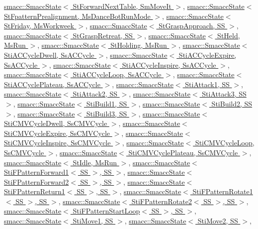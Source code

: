 \hyperlink{classsmacc_1_1SmaccState}{smacc\+::\+Smacc\+State$<$ St\+Forward\+Next\+Table, Sm\+Move\+It $>$}, \hyperlink{classsmacc_1_1SmaccState}{smacc\+::\+Smacc\+State$<$ St\+Fpattern\+Prealignment, Ms\+Dance\+Bot\+Run\+Mode $>$}, \hyperlink{classsmacc_1_1SmaccState}{smacc\+::\+Smacc\+State$<$ St\+Friday, Ms\+Workweek $>$}, \hyperlink{classsmacc_1_1SmaccState}{smacc\+::\+Smacc\+State$<$ St\+Grasp\+Approach, S\+S $>$}, \hyperlink{classsmacc_1_1SmaccState}{smacc\+::\+Smacc\+State$<$ St\+Grasp\+Retreat, S\+S $>$}, \hyperlink{classsmacc_1_1SmaccState}{smacc\+::\+Smacc\+State$<$ St\+Held, Ms\+Run $>$}, \hyperlink{classsmacc_1_1SmaccState}{smacc\+::\+Smacc\+State$<$ St\+Holding, Ms\+Run $>$}, \hyperlink{classsmacc_1_1SmaccState}{smacc\+::\+Smacc\+State$<$ Sti\+A\+C\+Cycle\+Dwell, Ss\+A\+C\+Cycle $>$}, \hyperlink{classsmacc_1_1SmaccState}{smacc\+::\+Smacc\+State$<$ Sti\+A\+C\+Cycle\+Expire, Ss\+A\+C\+Cycle $>$}, \hyperlink{classsmacc_1_1SmaccState}{smacc\+::\+Smacc\+State$<$ Sti\+A\+C\+Cycle\+Inspire, Ss\+A\+C\+Cycle $>$}, \hyperlink{classsmacc_1_1SmaccState}{smacc\+::\+Smacc\+State$<$ Sti\+A\+C\+Cycle\+Loop, Ss\+A\+C\+Cycle $>$}, \hyperlink{classsmacc_1_1SmaccState}{smacc\+::\+Smacc\+State$<$ Sti\+A\+C\+Cycle\+Plateau, Ss\+A\+C\+Cycle $>$}, \hyperlink{classsmacc_1_1SmaccState}{smacc\+::\+Smacc\+State$<$ Sti\+Attack1, S\+S $>$}, \hyperlink{classsmacc_1_1SmaccState}{smacc\+::\+Smacc\+State$<$ Sti\+Attack2, S\+S $>$}, \hyperlink{classsmacc_1_1SmaccState}{smacc\+::\+Smacc\+State$<$ Sti\+Attack3, S\+S $>$}, \hyperlink{classsmacc_1_1SmaccState}{smacc\+::\+Smacc\+State$<$ Sti\+Build1, S\+S $>$}, \hyperlink{classsmacc_1_1SmaccState}{smacc\+::\+Smacc\+State$<$ Sti\+Build2, S\+S $>$}, \hyperlink{classsmacc_1_1SmaccState}{smacc\+::\+Smacc\+State$<$ Sti\+Build3, S\+S $>$}, \hyperlink{classsmacc_1_1SmaccState}{smacc\+::\+Smacc\+State$<$ Sti\+C\+M\+V\+Cycle\+Dwell, Ss\+C\+M\+V\+Cycle $>$}, \hyperlink{classsmacc_1_1SmaccState}{smacc\+::\+Smacc\+State$<$ Sti\+C\+M\+V\+Cycle\+Expire, Ss\+C\+M\+V\+Cycle $>$}, \hyperlink{classsmacc_1_1SmaccState}{smacc\+::\+Smacc\+State$<$ Sti\+C\+M\+V\+Cycle\+Inspire, Ss\+C\+M\+V\+Cycle $>$}, \hyperlink{classsmacc_1_1SmaccState}{smacc\+::\+Smacc\+State$<$ Sti\+C\+M\+V\+Cycle\+Loop, Ss\+C\+M\+V\+Cycle $>$}, \hyperlink{classsmacc_1_1SmaccState}{smacc\+::\+Smacc\+State$<$ Sti\+C\+M\+V\+Cycle\+Plateau, Ss\+C\+M\+V\+Cycle $>$}, \hyperlink{classsmacc_1_1SmaccState}{smacc\+::\+Smacc\+State$<$ St\+Idle, Ms\+Run $>$}, \hyperlink{classsmacc_1_1SmaccState}{smacc\+::\+Smacc\+State$<$ Sti\+F\+Pattern\+Forward1$<$ S\+S $>$, S\+S $>$}, \hyperlink{classsmacc_1_1SmaccState}{smacc\+::\+Smacc\+State$<$ Sti\+F\+Pattern\+Forward2$<$ S\+S $>$, S\+S $>$}, \hyperlink{classsmacc_1_1SmaccState}{smacc\+::\+Smacc\+State$<$ Sti\+F\+Pattern\+Return1$<$ S\+S $>$, S\+S $>$}, \hyperlink{classsmacc_1_1SmaccState}{smacc\+::\+Smacc\+State$<$ Sti\+F\+Pattern\+Rotate1$<$ S\+S $>$, S\+S $>$}, \hyperlink{classsmacc_1_1SmaccState}{smacc\+::\+Smacc\+State$<$ Sti\+F\+Pattern\+Rotate2$<$ S\+S $>$, S\+S $>$}, \hyperlink{classsmacc_1_1SmaccState}{smacc\+::\+Smacc\+State$<$ Sti\+F\+Pattern\+Start\+Loop$<$ S\+S $>$, S\+S $>$}, \hyperlink{classsmacc_1_1SmaccState}{smacc\+::\+Smacc\+State$<$ Sti\+Move1, S\+S $>$}, \hyperlink{classsmacc_1_1SmaccState}{smacc\+::\+Smacc\+State$<$ Sti\+Move2, S\+S $>$}, 